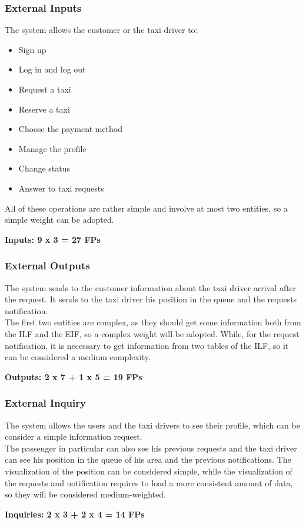 		\subsubsection{External Inputs}
			The system allows the customer or the taxi driver to:
			\begin{itemize}
				 \item Sign up
				 \item Log in and log out
				 \item Request a taxi
				 \item Reserve a taxi
				 \item Choose the payment method
				 \item Manage the profile
				 \item Change status
				 \item Answer to taxi requests
			\end{itemize}
			All of these operations are rather simple and involve at most two entities, so a simple weight can be adopted.
			\begin{center}
				\textbf{Inputs: 9 x 3 = 27 FPs}
			\end{center}
		\subsubsection{External Outputs}
			The system sends to the customer information about the taxi driver arrival after the request. It sends to the taxi driver his position in the queue and the requests notification.\\
			The first two entities are complex, as they should get some information both from the ILF and the EIF, so a complex weight will be adopted. While, for the request notification, it is necessary to get information from two tables of the ILF, so it can be considered a medium complexity.
			\begin{center}
				\textbf{Outputs: 2 x 7 + 1 x 5 = 19 FPs}
			\end{center}
		\subsubsection{External Inquiry}
			The system allows the users and the taxi drivers to see their profile, which can be consider a simple information request.\\The passenger in particular can also see his previous requests and the taxi driver can see his position in the queue of his area and the previous notifications. The visualization of the position can be considered simple, while the visualization of the requests and notification requires to load a more consistent amount of data, so they will be considered medium-weighted.
			\begin{center}
				\textbf{Inquiries: 2 x 3 + 2 x 4 = 14 FPs}
			\end{center}
		\newpage
